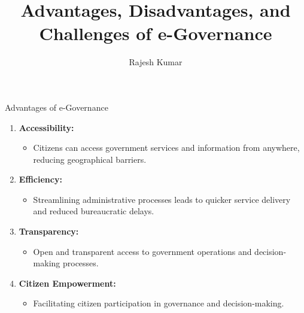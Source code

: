 
\title{Advantages, Disadvantages, and Challenges of e-Governance}
\author{Rajesh Kumar}
\date{}

\begin{frame}
  \titlepage
\end{frame}

\begin{frame}{Advantages of e-Governance}
  \begin{enumerate}
    \item \textbf{Accessibility:}
      \begin{itemize}
        \item Citizens can access government services and information from anywhere, reducing geographical barriers.
      \end{itemize}
    \item \textbf{Efficiency:}
      \begin{itemize}
        \item Streamlining administrative processes leads to quicker service delivery and reduced bureaucratic delays.
      \end{itemize}
    \item \textbf{Transparency:}
      \begin{itemize}
        \item Open and transparent access to government operations and decision-making processes.
      \end{itemize}
    \item \textbf{Citizen Empowerment:}
      \begin{itemize}
        \item Facilitating citizen participation in governance and decision-making.
      \end{itemize}
  \end{enumerate}
\end{frame}

